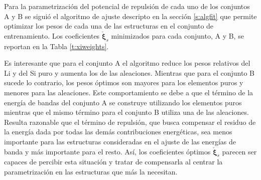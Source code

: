 Para la parametrización del potencial de repulsión de cada uno de los conjuntos 
A y B se siguió el algoritmo de ajuste descripto en la sección \ref{s:algfit}
que permite optimizar los pesos de cada una de las estructuras en el conjunto de 
entrenamiento. Los coeficientes $\check{\boldsymbol{\xi}}_s$ minimizados para cada
conjunto, A y B, se reportan en la Tabla \ref{t:xiweights}.
\begin{table}[h!]
    \centering
    \caption{Pesos óptimos, $\check{\boldsymbol{\xi}}_s$, de cada conjunto.}
    \setlength\extrarowheight{2pt}
    \label{t:xiweights}
\end{table}
Es interesante que para el conjunto A el algoritmo reduce los pesos relativos del 
Li y del Si puro y aumenta los de las aleaciones. Mientras que para el conjunto 
B sucede lo contrario, los pesos óptimos son mayores para los elementos puros y
menores para las aleaciones. Este comportamiento se debe a que el término de la 
energía de bandas del conjunto A se construye utilizando los elementos puros 
mientras que el mismo término para el conjunto B utiliza una de las aleaciones. 
Resulta razonable que el término de repulsión, que busca compensar el residuo de la 
energía dada por todas las demás contribuciones energéticas, sea menos importante 
para las estructuras consideradas en el ajuste de las energías de banda y más 
importante para el resto. Así, los coeficientes óptimos $\check{\boldsymbol{\xi}}_s$ 
parecen ser capaces de percibir esta situación y tratar de compensarla al centrar 
la parametrización en las estructuras que más la necesitan.


